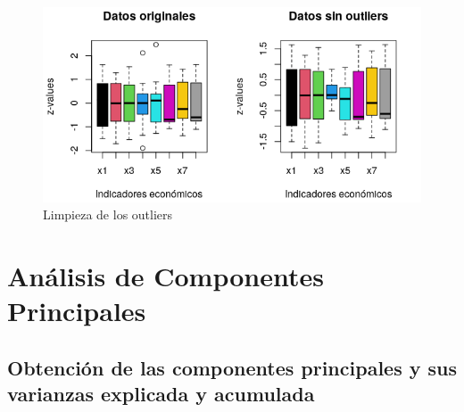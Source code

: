 \documentclass[12pt]{article}
\begin{document}
\begin{figure}[H]
  \centering
  \includegraphics[width=140mm]{imgs/boxplot-outliers}
  \caption{Limpieza de los outliers}
  \label{fig:boxplot-outliers}
\end{figure}

\pagebreak
\section{Análisis de Componentes Principales}

\subsection{Obtención de las componentes principales y sus varianzas explicada y acumulada}
\end{document}

